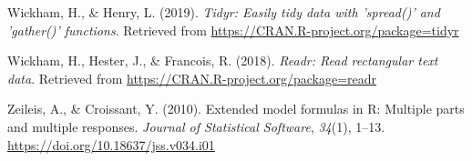 \documentclass[
  english,
  man]{apa6}
\begin{document}
\leavevmode\hypertarget{ref-R-tidyr}{}%
Wickham, H., \& Henry, L. (2019). \emph{Tidyr: Easily tidy data with 'spread()' and 'gather()' functions}. Retrieved from \url{https://CRAN.R-project.org/package=tidyr}

\leavevmode\hypertarget{ref-R-readr}{}%
Wickham, H., Hester, J., \& Francois, R. (2018). \emph{Readr: Read rectangular text data}. Retrieved from \url{https://CRAN.R-project.org/package=readr}

\leavevmode\hypertarget{ref-R-Formula}{}%
Zeileis, A., \& Croissant, Y. (2010). Extended model formulas in R: Multiple parts and multiple responses. \emph{Journal of Statistical Software}, \emph{34}(1), 1--13. \url{https://doi.org/10.18637/jss.v034.i01}

\endgroup
\end{document}
